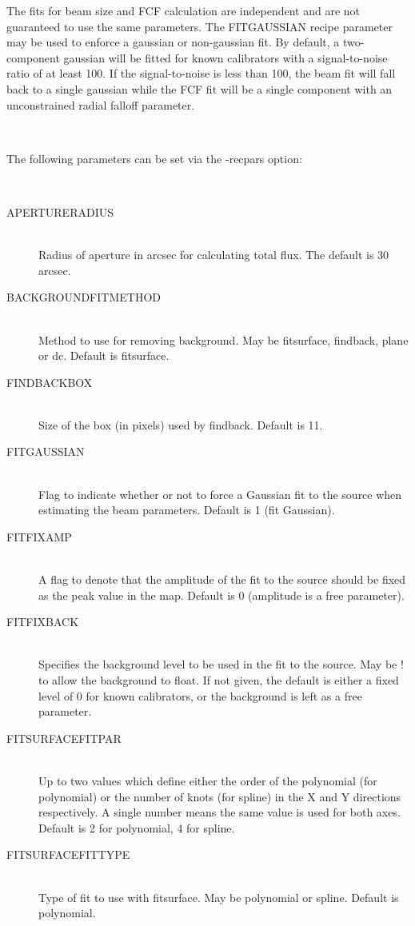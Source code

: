 \documentclass[twoside,11pt]{article}
\renewcommand{\_}{\texttt{\symbol{95}}}
\newcommand{\sstsubsection}[1]{ \item[{#1}] \mbox{} \\}
\newcommand{\sstdiylist}[2]{
   \item[#1:] \mbox{} \\
   \vspace{-3.5ex}
   \begin{description}
      #2
   \end{description}
}
\newcommand{\sstitem}{\item}
\newcommand{\sstsubsection}[1]{\item[{#1}]}
\newcommand{\sstitem}{\item}
\begin{document}
{{{         \sstitem
         The fits for beam size and FCF calculation are independent and
         are not guaranteed to use the same parameters. The FIT\_GAUSSIAN
         recipe parameter may be used to enforce a gaussian or non-gaussian
         fit. By default, a two-component gaussian will be fitted for known
         calibrators with a signal-to-noise ratio of at least 100. If the
         signal-to-noise is less than 100, the beam fit will fall back to a
         single gaussian while the FCF fit will be a single component with
         an unconstrained radial falloff parameter.
      }
   }
   \sstdiylist{
      Available Parameters
   }{
      \sstsubsection{
         The following parameters can be set via the -recpars option:
      }{
      }
      \sstsubsection{
         APERTURE\_RADIUS
      }{
         Radius of aperture in arcsec for calculating total flux. The
         default is 30 arcsec.
      }
      \sstsubsection{
         BACKGROUND\_FITMETHOD
      }{
         Method to use for removing background. May be fitsurface,
         findback, plane or dc. Default is fitsurface.
      }
      \sstsubsection{
         FINDBACK\_BOX
      }{
         Size of the box (in pixels) used by findback. Default is 11.
      }
      \sstsubsection{
         FIT\_GAUSSIAN
      }{
         Flag to indicate whether or not to force a Gaussian fit to the
         source when estimating the beam parameters. Default is 1 (fit
         Gaussian).
      }
      \sstsubsection{
         FIT\_FIXAMP
      }{
         A flag to denote that the amplitude of the fit to the source
         should be fixed as the peak value in the map. Default is 0
         (amplitude is a free parameter).
      }
      \sstsubsection{
         FIT\_FIXBACK
      }{
         Specifies the background level to be used in the fit to the
         source. May be ! to allow the background to float. If not
         given, the default is either a fixed level of 0 for known
         calibrators, or the background is left as a free parameter.
      }
      \sstsubsection{
         FITSURFACE\_FITPAR
      }{
         Up to two values which define either the order of the
         polynomial (for polynomial) or the number of knots (for spline)
         in the X and Y directions respectively. A single number means
         the same value is used for both axes. Default is 2 for
         polynomial, 4 for spline.
      }
      \sstsubsection{
         FITSURFACE\_FITTYPE
      }{
         Type of fit to use with fitsurface. May be polynomial or
         spline. Default is polynomial.
      }
      \sstsubsection{
}}}
\end{document}
